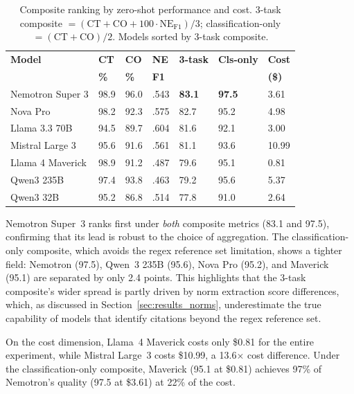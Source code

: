 \documentclass[11pt,a4paper]{article}
\begin{document}
\begin{table}[t]
\centering
\caption{Composite ranking by zero-shot performance and cost. 3-task composite $= (\text{CT} + \text{CO} + 100 \cdot \text{NE}_{\text{F1}}) / 3$; classification-only $= (\text{CT} + \text{CO})/2$. Models sorted by 3-task composite.}
\label{tab:composite}
\small
\begin{tabular}{lR{1.1cm}R{1.1cm}R{1.0cm}R{1.2cm}R{1.2cm}R{1.2cm}}
\toprule
\textbf{Model} & \textbf{CT} & \textbf{CO} & \textbf{NE} & \textbf{3-task} & \textbf{Cls-only} & \textbf{Cost} \\
 & \textbf{\%} & \textbf{\%} & \textbf{F1} & & & \textbf{(\$)} \\
\midrule
Nemotron Super 3  & 98.9 & 96.0 & .543 & \textbf{83.1} & \textbf{97.5} & 3.61 \\
Nova Pro          & 98.2 & 92.3 & .575 & 82.7 & 95.2 & 4.98 \\
Llama 3.3 70B     & 94.5 & 89.7 & .604 & 81.6 & 92.1 & 3.00 \\
Mistral Large 3   & 95.6 & 91.6 & .561 & 81.1 & 93.6 & 10.99 \\
Llama 4 Maverick  & 98.9 & 91.2 & .487 & 79.6 & 95.1 & 0.81 \\
Qwen3 235B        & 97.4 & 93.8 & .463 & 79.2 & 95.6 & 5.37 \\
Qwen3 32B         & 95.2 & 86.8 & .514 & 77.8 & 91.0 & 2.64 \\
\bottomrule
\end{tabular}
\end{table}

Nemotron Super~3 ranks first under \emph{both} composite metrics (83.1 and 97.5), confirming that its lead is robust to the choice of aggregation. The classification-only composite, which avoids the regex reference set limitation, shows a tighter field: Nemotron (97.5), Qwen~3 235B (95.6), Nova Pro (95.2), and Maverick (95.1) are separated by only 2.4 points. This highlights that the 3-task composite's wider spread is partly driven by norm extraction score differences, which, as discussed in Section~\ref{sec:results_norms}, underestimate the true capability of models that identify citations beyond the regex reference set.

On the cost dimension, Llama~4 Maverick costs only \$0.81 for the entire experiment, while Mistral Large~3 costs \$10.99, a 13.6$\times$ cost difference. Under the classification-only composite, Maverick (95.1 at \$0.81) achieves 97\% of Nemotron's quality (97.5 at \$3.61) at 22\% of the cost.
\end{document}
